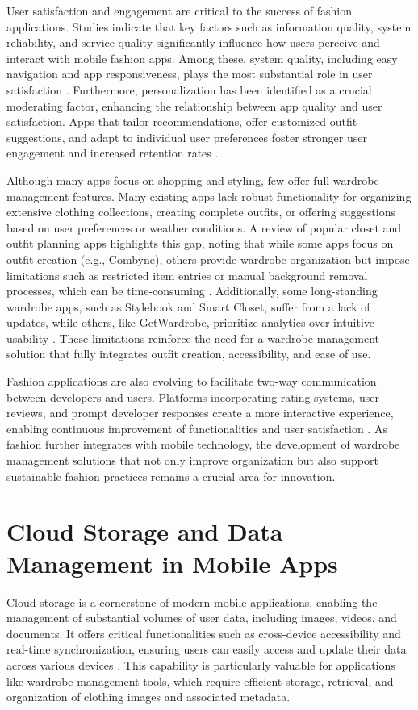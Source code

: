 User satisfaction and engagement are critical to the success of fashion applications. Studies indicate that key factors such as information quality, system reliability, and service quality significantly influence how users perceive and interact with mobile fashion apps. Among these, system quality, including easy navigation and app responsiveness, plays the most substantial role in user satisfaction \cite{trivedi2018fashion}. Furthermore, personalization has been identified as a crucial moderating factor, enhancing the relationship between app quality and user satisfaction. Apps that tailor recommendations, offer customized outfit suggestions, and adapt to individual user preferences foster stronger user engagement and increased retention rates \cite{trivedi2018fashion}.

Although many apps focus on shopping and styling, few offer full wardrobe management features. Many existing apps lack robust functionality for organizing extensive clothing collections, creating complete outfits, or offering suggestions based on user preferences or weather conditions. A review of popular closet and outfit planning apps highlights this gap, noting that while some apps focus on outfit creation (e.g., Combyne), others provide wardrobe organization but impose limitations such as restricted item entries or manual background removal processes, which can be time-consuming \cite{fits2024}. Additionally, some long-standing wardrobe apps, such as Stylebook and Smart Closet, suffer from a lack of updates, while others, like GetWardrobe, prioritize analytics over intuitive usability \cite{fits2024}. These limitations reinforce the need for a wardrobe management solution that fully integrates outfit creation, accessibility, and ease of use.

Fashion applications are also evolving to facilitate two-way communication between developers and users. Platforms incorporating rating systems, user reviews, and prompt developer responses create a more interactive experience, enabling continuous improvement of functionalities and user satisfaction \cite{nie2013between}. As fashion further integrates with mobile technology, the development of wardrobe management solutions that not only improve organization but also support sustainable fashion practices remains a crucial area for innovation.


\section{Cloud Storage and Data Management in Mobile Apps}
Cloud storage is a cornerstone of modern mobile applications, enabling the management of substantial volumes of user data, including images, videos, and documents. It offers critical functionalities such as cross-device accessibility and real-time synchronization, ensuring users can easily access and update their data across various devices \cite{bai2016cloud}. This capability is particularly valuable for applications like wardrobe management tools, which require efficient storage, retrieval, and organization of clothing images and associated metadata.

